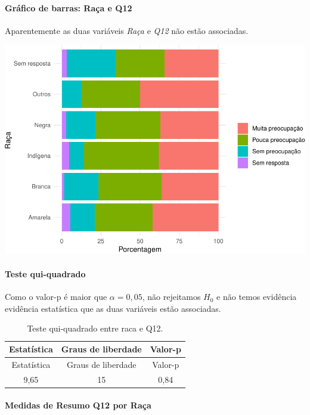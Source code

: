 \documentclass[]{article}
\let\oldparagraph\paragraph
\renewcommand{\paragraph}[1]{\oldparagraph{#1}\mbox{}}
\begin{document}
\hypertarget{gruxe1fico-de-barras-rauxe7a-e-q12}{%
\paragraph{Gráfico de barras: Raça e Q12}\label{gruxe1fico-de-barras-rauxe7a-e-q12}}

Aparentemente as duas variáveis \emph{Raça} e \emph{Q12} não estão associadas.

\begin{center}\includegraphics[width=0.75\linewidth]{relatorio_files/figure-latex/unnamed-chunk-39-1} \end{center}

\hypertarget{teste-qui-quadrado-5}{%
\paragraph{Teste qui-quadrado}\label{teste-qui-quadrado-5}}

Como o valor-p é maior que \(\alpha=0,05\), não rejeitamos \(H_0\) e não temos evidência evidência estatística que as duas variáveis estão associadas.

\begin{longtable}[]{@{}ccc@{}}
\caption{\label{tab:unnamed-chunk-40}Teste qui-quadrado entre raca e Q12.}\tabularnewline
\toprule
Estatística & Graus de liberdade & Valor-p\tabularnewline
\midrule
\endfirsthead
\toprule
Estatística & Graus de liberdade & Valor-p\tabularnewline
\midrule
\endhead
9,65 & 15 & 0,84\tabularnewline
\bottomrule
\end{longtable}

\cleardoublepage

\hypertarget{medidas-de-resumo-q12-por-rauxe7a}{%
\paragraph{Medidas de Resumo Q12 por Raça}\label{medidas-de-resumo-q12-por-rauxe7a}}
\end{document}
